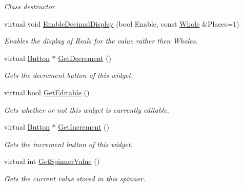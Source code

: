 \begin{DoxyCompactItemize}
\begin{DoxyCompactList}\small\item\em Class destructor. \item\end{DoxyCompactList}\item 
virtual void \hyperlink{classMezzanine_1_1UI_1_1Spinner_a8aec532dd425a40f9ea677e47fac730e}{EnableDecimalDisplay} (bool Enable, const \hyperlink{namespaceMezzanine_adcbb6ce6d1eb4379d109e51171e2e493}{Whole} \&Places=1)
\begin{DoxyCompactList}\small\item\em Enables the display of Reals for the value rather then Wholes. \item\end{DoxyCompactList}\item 
virtual \hyperlink{classMezzanine_1_1UI_1_1Button}{Button} $\ast$ \hyperlink{classMezzanine_1_1UI_1_1Spinner_a0268c48ff92989645ae5780b4715bc53}{GetDecrement} ()
\begin{DoxyCompactList}\small\item\em Gets the decrement button of this widget. \item\end{DoxyCompactList}\item 
virtual bool \hyperlink{classMezzanine_1_1UI_1_1Spinner_aa483b7cd680996e364156e0dcb774070}{GetEditable} ()
\begin{DoxyCompactList}\small\item\em Gets whether or not this widget is currently editable. \item\end{DoxyCompactList}\item 
virtual \hyperlink{classMezzanine_1_1UI_1_1Button}{Button} $\ast$ \hyperlink{classMezzanine_1_1UI_1_1Spinner_ad0a0508df75f896075ba08e13afcc946}{GetIncrement} ()
\begin{DoxyCompactList}\small\item\em Gets the increment button of this widget. \item\end{DoxyCompactList}\item 
virtual int \hyperlink{classMezzanine_1_1UI_1_1Spinner_a3b184c448b853d3424aaf5d1b1d836a2}{GetSpinnerValue} ()
\begin{DoxyCompactList}\small\item\em Gets the current value stored in this spinner. \item\end{DoxyCompactList}\item 

\end{DoxyCompactItemize}
